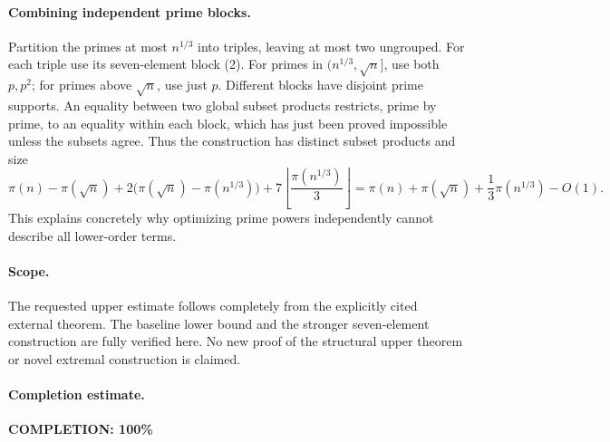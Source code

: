 \paragraph{Combining independent prime blocks.}
Partition the primes at most \(n^{1/3}\) into triples,
leaving at most two ungrouped.
For each triple use its seven-element block (2).
For primes in \((n^{1/3},\sqrt n]\), use both \(p,p^2\);
for primes above \(\sqrt n\), use just \(p\).
Different blocks have disjoint prime supports.
An equality between two global subset products restricts,
prime by prime, to an equality within each block, which
has just been proved impossible unless the subsets agree.
Thus the construction has distinct subset products and size
\[
 \pi(n)-\pi(\sqrt n)
 +2\bigl(\pi(\sqrt n)-\pi(n^{1/3})\bigr)
 +7\left\lfloor\frac{\pi(n^{1/3})}{3}\right\rfloor
 =
 \pi(n)+\pi(\sqrt n)+\frac13\pi(n^{1/3})-O(1).                  \tag{3}
\]
This explains concretely why optimizing prime powers
independently cannot describe all lower-order terms.

\paragraph{Scope.}
The requested upper estimate follows completely from the
explicitly cited external theorem. The baseline lower bound
and the stronger seven-element construction are fully
verified here. No new proof of the structural upper theorem
or novel extremal construction is claimed.

\paragraph{Completion estimate.}
\textbf{COMPLETION: 100\%}

